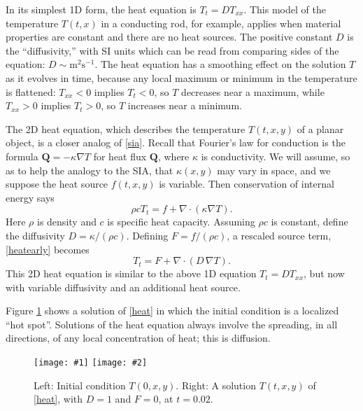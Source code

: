 \documentclass[letterpaper,final,12pt,reqno]{amsart}
\newcommand{\grad}{\nabla}
\newcommand{\Div}{\nabla\cdot}
\newcommand{\twofigsizes}[5]{
\begin{figure}[ht]
\centering
\texttt{[image: \#1]} \quad
\texttt{[image: \#2]}
\caption{#3}
\label{fig:#1}
\end{figure}}
\begin{document}
In its simplest 1D form, the heat equation is $T_t = D T_{xx}$.  This model of the temperature $T(t,x)$ in a conducting rod, for example, applies when material properties are constant and there are no heat sources.  The positive constant $D$ is the ``diffusivity,'' with SI units which can be read from comparing sides of the equation: $D\sim \text{m}^2 \text{s}^{-1}$.  The heat equation has a smoothing effect on the solution $T$ as it evolves in time, because any local maximum or minimum in the temperature is flattened: $T_{xx}<0$ implies $T_t<0$, so $T$ decreases near a maximum, while $T_{xx}>0$ implies $T_t>0$, so $T$ increases near a minimum.

The 2D heat equation, which describes the temperature $T(t,x,y)$ of a planar object, is a closer analog of \eqref{sia}.  Recall that Fourier's law for conduction is the formula $\mathbf{Q} = - \kappa \grad T$ for heat flux $\mathbf{Q}$, where $\kappa$ is conductivity.  We will assume, so as to help the analogy to the SIA, that $\kappa(x,y)$ may vary in space, and we suppose the heat source $f(t,x,y)$ is variable.  Then conservation of internal energy says
\begin{equation}
\rho c T_t = f + \Div (\kappa \grad T). \label{heatearly}
\end{equation}
Here $\rho$ is density and $c$ is specific heat capacity.  Assuming $\rho c$ is constant, define the diffusivity $D=\kappa/(\rho c)$.  Defining $F = f/(\rho c)$, a rescaled source term, \eqref{heatearly} becomes
\begin{equation}
T_t = F + \Div (D\, \grad T). \label{heat}
\end{equation}
This 2D heat equation is similar to the above 1D equation $T_t = D T_{xx}$, but now with variable diffusivity and an additional heat source.

Figure \ref{fig:initialheat} shows a solution of \eqref{heat} in which the initial condition is a localized ``hot spot''.  Solutions of the heat equation always involve the spreading, in all directions, of any local concentration of heat; this is diffusion.

\twofigsizes{initialheat}{finalheat}{Left: Initial condition $T(0,x,y)$.   Right: A solution $T(t,x,y)$ of  \eqref{heat}, with $D=1$ and $F=0$, at $t=0.02$.}{2.8in}{2.8in}
\end{document}
